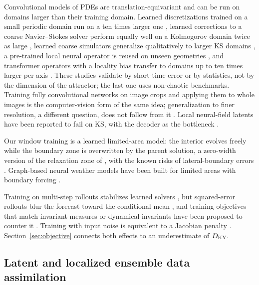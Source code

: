  Convolutional models of PDEs are
translation-equivariant and can be run on domains larger than their
training domain. Learned discretizations trained on a small periodic
domain run on a ten times larger one \citep{barsinai2019}, learned
corrections to a coarse Navier--Stokes solver perform equally well on a
Kolmogorov domain twice as large \citep{kochkov2021}, learned coarse
simulators generalize qualitatively to larger KS domains
\citep{stachenfeld2022}, a pre-trained local neural operator is reused on
unseen geometries \citep{li2024lno}, and transformer operators with a
locality bias transfer to domains up to ten times larger per axis
\citep{devilleroche2026}. These studies validate by short-time error or
by statistics, not by the dimension of the attractor; the last one uses
non-chaotic benchmarks. Training fully convolutional networks on image
crops and applying them to whole images \citep{long2015} is the
computer-vision form of the same idea; generalization to finer
resolution, a different question, does not follow from it
\citep{sakarvadia2026}. Local neural-field latents have been reported to
fail on KS, with the decoder as the bottleneck \citep{aroma2024}.

 Our window training is a learned
limited-area model: the interior evolves freely while the boundary zone
is overwritten by the parent solution, a zero-width version of the
relaxation zone of \citet{davies1976}, with the known risks of
lateral-boundary errors \citep{warner1997}. Graph-based neural weather
models have been built for limited areas with boundary forcing
\citep{oskarsson2023}.

 Training on multi-step rollouts stabilizes
learned solvers \citep{brandstetter2022,lippe2023}, but squared-error
rollouts blur the forecast toward the conditional mean
\citep{lam2023graphcast,bonavita2024}, and training objectives that match
invariant measures or dynamical invariants have been proposed to counter
it \citep{jiang2023,schiff2024,platt2023}. Training with input noise is
equivalent to a Jacobian penalty \citep{bishop1995}. Section~\ref{sec:objective}
connects both effects to an underestimate of $D_{\mathrm{KY}}$.

\subsection{Latent and localized ensemble data assimilation}
\label{sec:bg_da}

